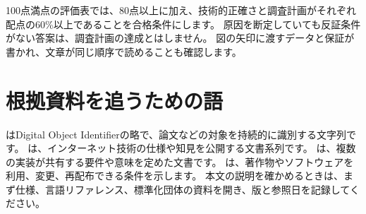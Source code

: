 100点満点の評価表では、80点以上に加え、技術的正確さと調査計画がそれぞれ配点の60\%以上であることを合格条件にします。
原因を断定していても反証条件がない答案は、調査計画の達成とはしません。
図の矢印に渡すデータと保証が書かれ、文章が同じ順序で読めることも確認します。

\section{根拠資料を追うための語}

はDigital Object Identifierの略で、論文などの対象を持続的に識別する文字列です。
は、インターネット技術の仕様や知見を公開する文書系列です。
は、複数の実装が共有する要件や意味を定めた文書です。
は、著作物やソフトウェアを利用、変更、再配布できる条件を示します。
本文の説明を確かめるときは、まず仕様、言語リファレンス、標準化団体の資料を開き、版と参照日を記録してください。
